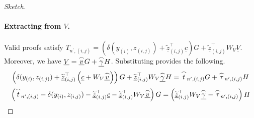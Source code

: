 \documentclass{article}
\theoremstyle{definition}
\newcommand{\zq}{\widetilde{\underline{z}}}
\begin{document}
\begin{proof}[Sketch]
\paragraph{Extracting from $\underline{V}$.} Valid proofs satisfy $T_{n^\prime,(i,j)} = (\delta(y_{(i)},z_{(i,j)}) + \zq^\top_{(i,j)} \underline{c})G + \zq^\top_{(i,j)} W_V \underline{V}$. Moreover, we have $\underline{V} = \underline{\overset{\LARGE \frown}{\small{v}}}G + \underline{\overset{\LARGE \frown}{\small{\gamma}}}H$. Substituting provides the following.
$$\left(\delta(y_{(i)},z_{(i,j)}) + \zq_{(i,j)}^\top\left(\underline{c} + W_V \underline{\overset{\LARGE \frown}{\small{v}}}\right)\right)G + \zq_{(i,j)}^\top W_V \underline{\overset{\LARGE \frown}{\small{\gamma}}}H  = \overset{\LARGE \frown}{\small{t}}_{n^\prime, (i,j)}G + \overset{\LARGE \frown}{\small{\tau}}_{n^\prime, (i,j)}H$$
$$\left(\overset{\LARGE \frown}{\small{t}}_{n^\prime,(i,j)} - \delta(y_{(i)},z_{(i,j)}) - \zq^\top_{(i,j)} \underline{c} - \zq^\top_{(i,j)} W_V \underline{\overset{\LARGE \frown}{\small{v}}}\right)G = \left(\zq^\top_{(i,j)} W_V \underline{\overset{\LARGE \frown}{\small{\gamma}}} - \overset{\LARGE \frown}{\small{\tau}}_{n^\prime,(i,j)}\right) H$$


\end{proof}
\end{document}
